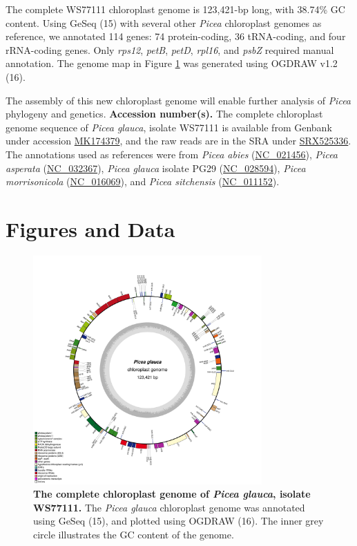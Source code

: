 \documentclass[titlepage,11pt, oneside]{article}   	%
\begin{document}
\newline
\par
The complete WS77111 chloroplast genome is 123,421-bp long, with 38.74\% GC content. Using GeSeq (15) with several other \textit{Picea} chloroplast genomes as reference, we annotated 114 genes: 74 protein-coding, 36 tRNA-coding, and four rRNA-coding genes. Only \textit{rps12}, \textit{petB}, \textit{petD}, \textit{rpl16}, and \textit{psbZ} required manual annotation. The genome map in Figure \ref{fig:ogdraw} was generated using OGDRAW v1.2 (16). 
\newline
\par
The assembly of this new chloroplast genome will enable further analysis of \textit{Picea} phylogeny and genetics.
\newline
\newline
\textbf{Accession number(s).} The complete chloroplast genome sequence of \textit{Picea glauca}, isolate WS77111 is available from Genbank under accession \href{https://www.ncbi.nlm.nih.gov/nuccore/MK174379}{MK174379}, and the raw reads are in the SRA under \href{https://www.ncbi.nlm.nih.gov/sra/SRX525336}{SRX525336}. The annotations used as references were from \textit{Picea abies} (\href{https://www.ncbi.nlm.nih.gov/nuccore/NC_021456}{NC\_021456}), \textit{Picea asperata} (\href{https://www.ncbi.nlm.nih.gov/nuccore/NC_032367}{NC\_032367}), \textit{Picea glauca} isolate PG29 (\href{https://www.ncbi.nlm.nih.gov/nuccore/NC_028594}{NC\_028594}), \textit{Picea morrisonicola} (\href{https://www.ncbi.nlm.nih.gov/nuccore/NC_016069}{NC\_016069}), and \textit{Picea sitchensis }(\href{https://www.ncbi.nlm.nih.gov/nuccore/NC_011152}{NC\_011152}).

\section*{Figures and Data}
\begin{figure}[h]
\centering
\includegraphics[width=0.78\textwidth]{WS77111}
\caption{\textbf{The complete chloroplast genome of \textit{Picea glauca}, isolate WS77111.} The \textit{Picea glauca} chloroplast genome was annotated using GeSeq (15), and plotted using OGDRAW (16). The inner grey circle illustrates the GC content of the genome.}
\label{fig:ogdraw}
\end{figure}
\end{document}
